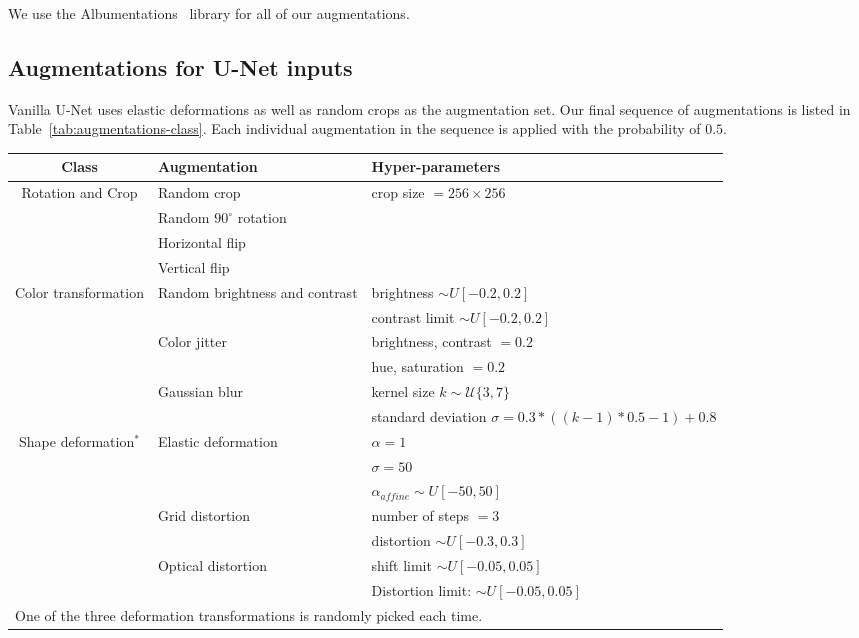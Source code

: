 We use the Albumentations~\cite{albumentations} library for all of our augmentations.


\subsection{Augmentations for U-Net inputs}\label{appendix:augmentations-class}
Vanilla U-Net \cite{unet} uses elastic deformations as well as random crops as the augmentation set.
Our final sequence of augmentations is listed in Table~\ref{tab:augmentations-class}.
Each individual augmentation in the sequence is applied with the probability of $0.5$.

\begin{table*}
\centering
    \caption{
        Augmentations are applied sequentially in the following order with a probability of 0.5.
    }\label{tab:augmentations-class}
    \begin{tabular}{c l l}
        \toprule
        Class & Augmentation & Hyper-parameters \\
        \midrule
        \multirow{4}{*}{Rotation and Crop} & Random crop & crop size $= 256 \times 256$ \\
        & Random $90^{\circ}$ rotation & \\
        & Horizontal flip & \\
        & Vertical flip & \\
        \midrule
        \multirow{6}{*}{Color transformation} & \multirow[t]{2}{*}{Random brightness and contrast} & brightness $\sim U[-0.2, 0.2]$ \\
        & & contrast limit $\sim U[-0.2, 0.2]$ \\
        & \multirow[t]{2}{*}{Color jitter} & brightness, contrast $= 0.2$\\
        &  & hue, saturation $= 0.2$\\
        & \multirow[t]{2}{*}{Gaussian blur} & kernel size $k \sim \mathcal{U}\{3, 7\}$\\
        &  & standard deviation $\sigma = 0.3*((k-1)*0.5 - 1) + 0.8$\\
        \midrule
        \multirow{7}{*}{Shape deformation$^*$} & \multirow[t]{3}{*}{Elastic deformation} & $\alpha=1$ \\
        & & $\sigma=50$ \\
        & & $\alpha_{affine} \sim U[-50,50]$ \\
        & \multirow[t]{2}{*}{Grid distortion} & number of steps $=3$\\
        & & distortion $\sim U[-0.3, 0.3]$  \\
        & \multirow[t]{2}{*}{Optical distortion} & shift limit $\sim U[-0.05, 0.05]$\\
        & & Distortion limit: $\sim U[-0.05, 0.05]$  \\
        \bottomrule
        \multicolumn{3}{l}{\small * One of the three deformation transformations is randomly picked each time.}
    \end{tabular}
\end{table*}

